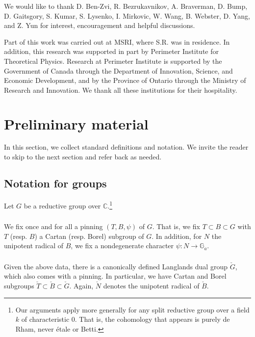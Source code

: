\documentclass[11pt,reqno]{amsart}
\theoremstyle{remark}
\numberwithin{equation}{section}
\begin{document}
\vspace{2mm}

 We would like to thank 
D. Ben-Zvi, R. Bezrukavnikov, A. 
Braverman, D. Bump, D. 
Gaitsgory, S. Kumar, S. Lysenko, I. Mirkovic, W. Wang, B. Webster, D. Yang, and 
Z. Yun for 
interest, encouragement 
and helpful 
discussions. 

Part of this work was carried out at MSRI, where
S.R. was in residence. 
In addition, this research was supported in part by 
Perimeter Institute for Theoretical
Physics. Research at Perimeter Institute is supported by the Government of 
Canada through
the Department of Innovation, Science, and Economic Development, and by the 
Province of
Ontario through the Ministry of Research and Innovation.
We thank all these institutions for their 
hospitality. 

\section{Preliminary material} \label{s:notation}

In this section, we collect standard definitions and notation. We invite the reader 
to skip to the next section and refer back as needed. 

\subsection{Notation for groups}Let $G$ be a reductive group over 
$\mathbb{C}$.\footnote{Our arguments
	apply more generally for any split reductive group over a field $k$
	of characteristic $0$. That is, the cohomology that appears is purely de 
	Rham,
	never \'etale or Betti.} 

\subsubsection{}We fix once and for all a pinning $(T,B,\psi)$ of $G$. 
That is, we fix $T \subset B \subset G$
with $T$ (resp. $B$) a Cartan (resp. Borel) subgroup of $G$.
In addition, for $N$ the unipotent radical of $B$,
we fix a nondegenerate character $\psi:N \to \mathbb{G}_a$.

\subsubsection{}

Given the above data, there is a canonically defined 
Langlands dual group $\check{G}$, which
also comes with a pinning. In particular,
we have Cartan and Borel subgroups
$\check{T} \subset \check{B} \subset \check{G}$.
Again, $\check{N}$ denotes the unipotent radical
of $\check{B}$. 
\end{document}
